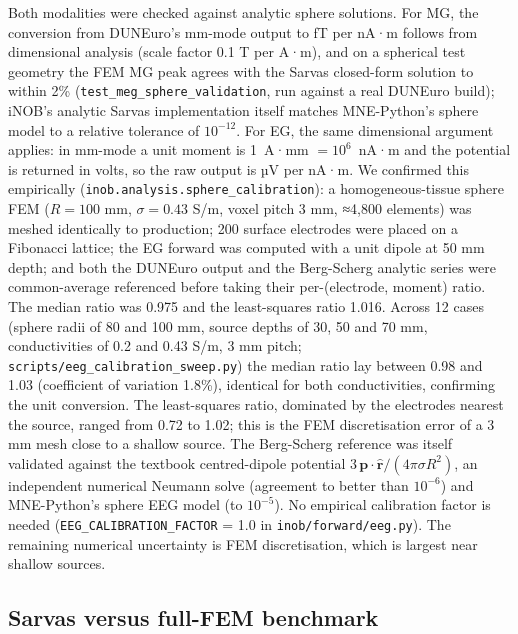 \documentclass[11pt]{article}
\newcommand{\revised}[1]{#1}
\begin{document}
\revised{Both modalities were checked against analytic sphere solutions. For
MG, the conversion from DUNEuro's mm-mode output to fT per nA·m follows
from dimensional analysis (scale factor 0.1 T per A·m), and on a
spherical test geometry the FEM MG peak agrees with the Sarvas
closed-form solution to within 2\% (\texttt{test\_meg\_sphere\_validation},
run against a real DUNEuro build); iNOB's analytic Sarvas implementation
itself matches MNE-Python's sphere model to a relative tolerance of
\(10^{-12}\). For EG, the same dimensional argument applies: in mm-mode
a unit moment is 1~A·mm \(= 10^{6}\)~nA·m and the potential is returned
in volts, so the raw output is µV per nA·m. We confirmed this
empirically (\texttt{inob.analysis.sphere\_calibration}): a
homogeneous-tissue sphere FEM (\(R = 100\) mm, \(\sigma = 0.43\) S/m,
voxel pitch 3 mm, ≈4,800 elements) was meshed identically to
production; 200 surface electrodes were placed on a Fibonacci lattice;
the EG forward was computed with a unit dipole at 50 mm depth; and both
the DUNEuro output and the Berg-Scherg analytic series were
common-average referenced before taking their per-(electrode, moment)
ratio. The median ratio was 0.975 and the least-squares ratio 1.016.
Across 12 cases (sphere radii of 80 and 100 mm, source depths of 30, 50
and 70 mm, conductivities of 0.2 and 0.43 S/m, 3 mm pitch;
\texttt{scripts/eeg\_calibration\_sweep.py}) the median ratio lay
between 0.98 and 1.03 (coefficient of variation 1.8\%), identical for
both conductivities, confirming the unit conversion. The least-squares
ratio, dominated by the electrodes nearest the source, ranged from 0.72
to 1.02; this is the FEM discretisation error of a 3 mm mesh close to a
shallow source. The Berg-Scherg reference
was itself validated against the textbook centred-dipole potential
\(3\,\mathbf{p}\cdot\hat{\mathbf{r}}/(4\pi\sigma R^{2})\), an
independent numerical Neumann solve (agreement to better than
\(10^{-6}\)) and
MNE-Python's sphere EEG model (to \(10^{-5}\)). No empirical calibration factor is
needed (\texttt{EEG\_CALIBRATION\_FACTOR} = 1.0 in
\texttt{inob/forward/eeg.py}).
The remaining numerical uncertainty is FEM
discretisation, which is largest near shallow sources.}

\subsection{Sarvas versus full-FEM
benchmark}\label{sarvas-versus-full-fem-benchmark}
\end{document}
